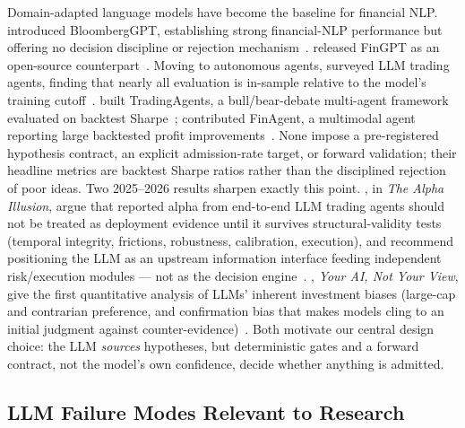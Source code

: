 \documentclass[11pt]{article}
\begin{document}
Domain-adapted language models have become the baseline for financial NLP\@.
\citet{wu2023bloomberggpt} introduced BloombergGPT, establishing strong
financial-NLP performance but offering no decision discipline or rejection
mechanism~\citep{wu2023bloomberggpt}. \citet{yang2023fingpt} released FinGPT
as an open-source counterpart~\citep{yang2023fingpt}. Moving to autonomous
agents, \citet{ding2024llmagentfinance} surveyed LLM trading agents, finding
that nearly all evaluation is in-sample relative to the model's training
cutoff~\citep{ding2024llmagentfinance}. \citet{xiao2024tradingagents} built
TradingAgents, a bull/bear-debate multi-agent framework evaluated on backtest
Sharpe~\citep{xiao2024tradingagents}; \citet{zhang2024finagent} contributed
FinAgent, a multimodal agent reporting large backtested profit
improvements~\citep{zhang2024finagent}. None impose a pre-registered
hypothesis contract, an explicit admission-rate target, or forward validation;
their headline metrics are backtest Sharpe ratios rather than the disciplined
rejection of poor ideas. Two 2025--2026 results sharpen exactly this point.
\citet{ye2026alphaillusion}, in \emph{The Alpha Illusion}, argue that reported
alpha from end-to-end LLM trading agents should not be treated as deployment
evidence until it survives structural-validity tests (temporal integrity,
frictions, robustness, calibration, execution), and recommend positioning the
LLM as an upstream information interface feeding independent risk/execution
modules --- not as the decision engine~\citep{ye2026alphaillusion}.
\citet{lee2025yourai}, \emph{Your AI, Not Your View}, give the first
quantitative analysis of LLMs' inherent investment biases (large-cap and
contrarian preference, and confirmation bias that makes models cling to an
initial judgment against counter-evidence)~\citep{lee2025yourai}. Both motivate
our central design choice: the LLM \emph{sources} hypotheses, but deterministic
gates and a forward contract, not the model's own confidence, decide whether
anything is admitted.

\subsection{LLM Failure Modes Relevant to Research}
\end{document}
